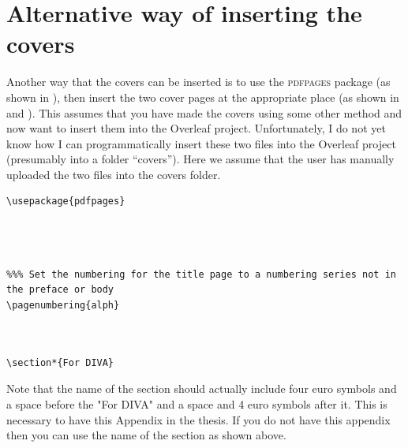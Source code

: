 \section{Alternative way of inserting the covers}
Another way that the covers can be inserted is to use the \textsc{pdfpages} package (as shown in ), then insert the two cover pages at the appropriate place (as shown in  and ). This assumes that you have made the covers using some other method and now want to insert them into the Overleaf project. Unfortunately, I do not yet know how I can programmatically insert these two files into the Overleaf project (presumably into a folder “covers”). Here we assume that the user has manually uploaded the two files into the covers folder.
\begin{lstlisting}[language={[LaTeX]TeX}, caption={Insert this include file either in the main text document or the includes.tex file}, label=lst:includeAfterHyperref]
% To use KTH pdf covers
\usepackage{pdfpages}


\end{lstlisting} 	
\begin{lstlisting}[language={[LaTeX]TeX}, caption={Insert the front cover before the title page}, label=lst:frontCover]
% Add front cover


%%% Set the numbering for the title page to a numbering series not in the preface or body
\pagenumbering{alph}
\end{lstlisting}

\begin{lstlisting}[language={[LaTeX]TeX}, caption={Insert the back cover page before the For DiVA section}, label=lst:backCover]
% Add back cover, unsure if this is supposed to be before or after the "For DiVA" pages


\section*{For DIVA}
\end{lstlisting}

Note that the name of the section should actually include four euro symbols and a space before the "For DIVA" and a space and 4 euro symbols after it. This is necessary to have this Appendix in the thesis. If you do not have this appendix then you can use the name of the section as shown above.
\clearpage

